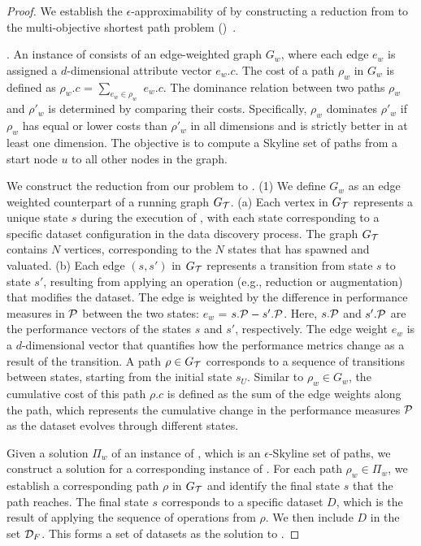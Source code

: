 \begin{proof}
We establish the $\epsilon$-approximability of \apxmodis by constructing a reduction from \modis to the multi-objective 
shortest path problem (\mos)~\cite{tsaggouris2009multiobjective}. 

.
An instance of \mos consists of an edge-weighted graph $G_w$, where each edge $e_w$ is assigned a $d$-dimensional attribute vector $e_w.c$. The cost of a path $\rho_w$ in $G_w$ is defined as $\rho_w.c$ = $\sum_{e_w\in\rho_w}$ $e_w.c$. 
The dominance relation between two paths $\rho_w$ and $\rho'_w$ is determined by comparing their costs. 
Specifically, $\rho_w$ dominates $\rho'_w$ if $\rho_w$ has equal or lower costs than $\rho'_w$ in all dimensions and is strictly better in at least one dimension. 
The objective is to compute a Skyline set of paths from a start node $u$ to all other nodes in the graph. 

We construct the reduction from our problem to \mos. 
(1) We define $G_w$ as an edge weighted counterpart 
of a running graph $G_\T$. (a) Each vertex in $G_\T$ represents a unique state $s$ during the execution of \apxmodis, with each state corresponding to a specific dataset configuration in the data discovery process. The graph $G_\T$ contains $N$ vertices, corresponding to the $N$ states that \apxmodis has spawned and valuated. 
(b) Each edge $(s, s')$ in $G_\T$ represents a transition from state $s$ to state $s'$, resulting from applying an operation (e.g., reduction or augmentation) that modifies the dataset. The edge is weighted by the difference in performance measures in $\P$ between the two states: $e_w$ = $s.\P - s'.\P$. 
Here, $s.\P$ and $s'.\P$ are the performance vectors of the states $s$ and $s'$, respectively. The edge weight $e_w$ is a $d$-dimensional vector that quantifies how the performance metrics change as a result of the transition. 
A path $\rho \in G_\T$ corresponds to a sequence of transitions between states, starting from the initial state $s_U$. 
Similar to $\rho_w \in G_w$, the cumulative cost of this path $\rho.c$ is defined as the sum of the edge weights along the path, which represents the cumulative change in the performance measures $\P$ as the dataset evolves through different states. 

Given a solution $\Pi_w$ of an instance of \mos, which is an $\epsilon$-Skyline set of paths, we construct a solution for a corresponding 
instance of \modis. 
For each path $\rho_w \in \Pi_w$, we establish a corresponding path $\rho$ in $G_\T$ and identify the final state $s$ that the path reaches.
The final state $s$ corresponds to a specific dataset $D$, which is the result of applying the sequence of operations from $\rho$. 
We then include $D$ in the set $\D_F$. 
This forms a set of datasets as the solution to \modis. 


\end{proof}
